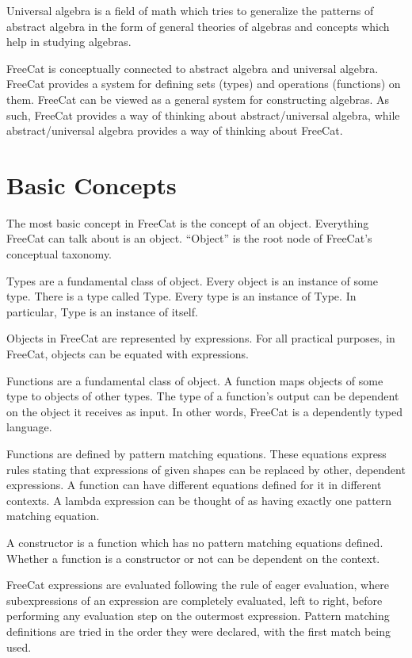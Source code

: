 \documentclass{article}
\begin{document}
Universal algebra is a field of math which tries to generalize the patterns of abstract algebra in the form of general theories of algebras and concepts which help in studying algebras.

FreeCat is conceptually connected to abstract algebra and universal algebra. FreeCat provides a system for defining sets (types) and operations (functions) on them. FreeCat can be viewed as a general system for constructing algebras. As such, FreeCat provides a way of thinking about abstract/universal algebra, while abstract/universal algebra provides a way of thinking about FreeCat.

\section{Basic Concepts}

The most basic concept in FreeCat is the concept of an object. Everything FreeCat can talk about is an object. ``Object'' is the root node of FreeCat's conceptual taxonomy.

Types are a fundamental class of object. Every object is an instance of some type. There is a type called Type. Every type is an instance of Type. In particular, Type is an instance of itself.

Objects in FreeCat are represented by expressions. For all practical purposes, in FreeCat, objects can be equated with expressions.

Functions are a fundamental class of object. A function maps objects of some type to objects of other types. The type of a function's output can be dependent on the object it receives as input. In other words, FreeCat is a dependently typed language.

Functions are defined by pattern matching equations. These equations express rules stating that expressions of given shapes can be replaced by other, dependent expressions. A function can have different equations defined for it in different contexts. A lambda expression can be thought of as having exactly one pattern matching equation.

A constructor is a function which has no pattern matching equations defined. Whether a function is a constructor or not can be dependent on the context.

FreeCat expressions are evaluated following the rule of eager evaluation, where subexpressions of an expression are completely evaluated, left to right, before performing any evaluation step on the outermost expression. Pattern matching definitions are tried in the order they were declared, with the first match being used.
\end{document}
